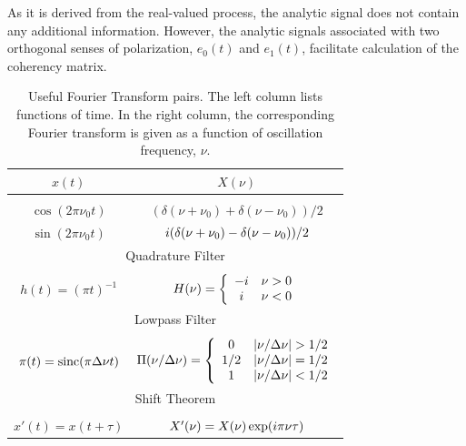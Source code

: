 As it is derived from the real-valued process, the analytic signal
does not contain any additional information.  However, the analytic
signals associated with two orthogonal senses of polarization, $e_0(t)$ and
$e_1(t)$, facilitate calculation of the coherency matrix.  

\begin{table}
\caption
{Useful Fourier Transform pairs. The left column lists functions of
time.  In the right column, the corresponding Fourier transform is
given as a function of oscillation frequency, $\nu$. 
}
\label{tab:fourier}
\begin{center}
\begin{tabular}{c|c}
\hline
\hline
$x(t)$ & $X(\nu)$ \\
\hline \\ [-3mm]
$\cos(2\pi\nu_0t)$ & $(\delta(\nu+\nu_0)+\delta(\nu-\nu_0)) / 2$ \\ [3mm]
$\sin(2\pi\nu_0t)$ & $i (\delta(\nu+\nu_0)-\delta(\nu-\nu_0)) / 2$ \\ [2mm]
%
\hline
\multicolumn{2}{c}{Quadrature Filter} \\
\hline \\ [-3mm]
%
$h(t)=(\pi t)^{-1}$ & 
$H(\nu) =\left\{ \begin{array}{cc}
            -i & \nu > 0 \\
            i  & \nu < 0 \end{array} \right.$ \\ [4mm]
%
\hline
\multicolumn{2}{c}{Lowpass Filter} \\
\hline \\ [-3mm]
%
$\pi(t)=\mathrm{sinc}(\pi \Delta\nu  t)$ & 
$\Pi(\nu/ \Delta\nu ) = \left\{ \begin{array}{cc}
            0  & |\nu/ \Delta\nu | > 1/2 \\
            1/2& |\nu/ \Delta\nu | = 1/2 \\
            1  & |\nu/ \Delta\nu | < 1/2 \end{array} \right.$  \\ [6mm]
%
\hline
\multicolumn{2}{c}{Shift Theorem} \\
\hline \\ [-3mm]
%
$x'(t)=x(t + \tau)$ & 
$X'(\nu) = X(\nu) \exp(i \pi \nu \tau)$  \\ [2mm]
%
\hline
\end{tabular}
\end{center}
\end{table}

